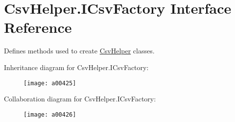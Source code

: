 \hypertarget{a00107}{\section{Csv\-Helper.\-I\-Csv\-Factory Interface Reference}
\label{a00107}
}


Defines methods used to create \hyperlink{a00311}{Csv\-Helper} classes.  




Inheritance diagram for Csv\-Helper.\-I\-Csv\-Factory\-:
\nopagebreak
\begin{figure}[H]
\begin{center}
\leavevmode
\texttt{[image: a00425]}
\end{center}
\end{figure}


Collaboration diagram for Csv\-Helper.\-I\-Csv\-Factory\-:
\nopagebreak
\begin{figure}[H]
\begin{center}
\leavevmode
\texttt{[image: a00426]}
\end{center}
\end{figure}
